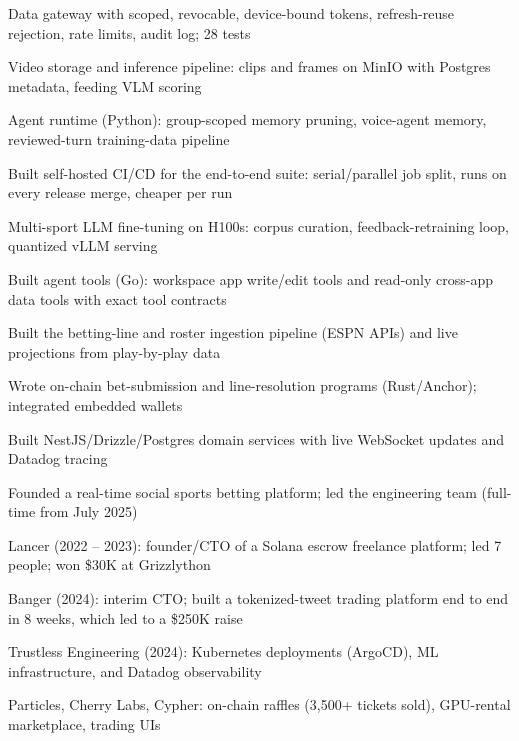 \documentclass[print]{jack-resume}
\begin{document}
\begin{tightemize}
    \item Data gateway with scoped, revocable, device-bound tokens, refresh-reuse rejection, rate limits, audit log; 28 tests
    \item Video storage and inference pipeline: clips and frames on MinIO with Postgres metadata, feeding VLM scoring
    \item Agent runtime (Python): group-scoped memory pruning, voice-agent memory, reviewed-turn training-data pipeline
    \item Built self-hosted CI/CD for the end-to-end suite: serial/parallel job split, runs on every release merge, cheaper per run
    \item Multi-sport LLM fine-tuning on H100s: corpus curation, feedback-retraining loop, quantized vLLM serving
    \item Built agent tools (Go): workspace app write/edit tools and read-only cross-app data tools with exact tool contracts
\end{tightemize}
\sectionsep

\begin{tightemize}
    \item Built the betting-line and roster ingestion pipeline (ESPN APIs) and live projections from play-by-play data
    \item Wrote on-chain bet-submission and line-resolution programs (Rust/Anchor); integrated embedded wallets
    \item Built NestJS/Drizzle/Postgres domain services with live WebSocket updates and Datadog tracing
    \item Founded a real-time social sports betting platform; led the engineering team (full-time from July 2025)
\end{tightemize}
\sectionsep

\begin{tightemize}
    \item Lancer (2022 – 2023): founder/CTO of a Solana escrow freelance platform; led 7 people; won \$30K at Grizzlython
    \item Banger (2024): interim CTO; built a tokenized-tweet trading platform end to end in 8 weeks, which led to a \$250K raise
    \item Trustless Engineering (2024): Kubernetes deployments (ArgoCD), ML infrastructure, and Datadog observability
    \item Particles, Cherry Labs, Cypher: on-chain raffles (3,500+ tickets sold), GPU-rental marketplace, trading UIs
\end{tightemize}
\sectionsep
\end{document}
